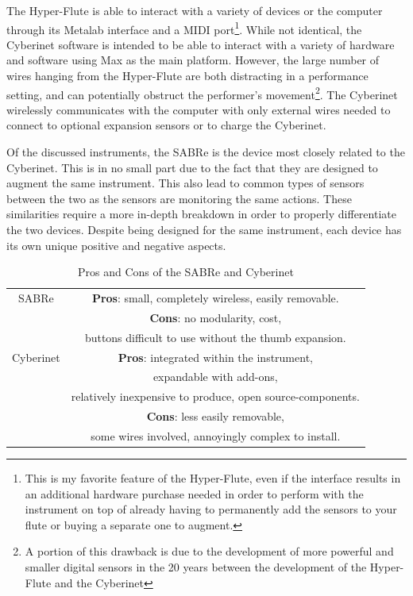 The Hyper-Flute is able to interact with a variety of devices or the computer through its Metalab interface and a MIDI port\footnote{This is my favorite feature of the Hyper-Flute, even if the interface results in an additional hardware purchase needed in order to perform with the instrument on top of already having to permanently add the sensors to your flute or buying a separate one to augment.}. While not identical, the Cyberinet software is intended to be able to interact with a variety of hardware and software using Max as the main platform. However, the large number of wires hanging from the Hyper-Flute are both distracting in a performance setting, and can potentially obstruct the performer's movement\footnote{A portion of this drawback is due to the development of more powerful and smaller digital sensors in the 20 years between the development of the Hyper-Flute and the Cyberinet}. The Cyberinet wirelessly communicates with the computer with only external wires needed to connect to optional expansion sensors or to charge the Cyberinet.


Of the discussed instruments, the SABRe is the device most closely related to the Cyberinet. This is in no small part due to the fact that they are designed to augment the same instrument. This also lead to common types of sensors between the two as the sensors are monitoring the same actions. These similarities require a more in-depth breakdown in order to properly differentiate the two devices. Despite being designed for the same instrument, each device has its own unique positive and negative aspects.


\begin{table}[]
    \centering
    \begin{tabular}{|c||c|}
    \hline
     SABRe & \textbf{Pros}: small, completely wireless, easily removable. \\
         & \textbf{Cons}: no modularity, cost, \\
         & buttons difficult to use without the thumb expansion.\\
         \hline
    Cyberinet & \textbf{Pros}: integrated within the instrument,\\
    & expandable with add-ons,\\ 
    & relatively inexpensive to produce, open source-components.\\
    & \textbf{Cons}: less easily removable, \\
    & some wires involved, annoyingly complex to install.\\
    \hline
    \end{tabular}
    \caption{Pros and Cons of the SABRe and Cyberinet}
    \label{tab:sabreCyberinetProCons}
\end{table}



